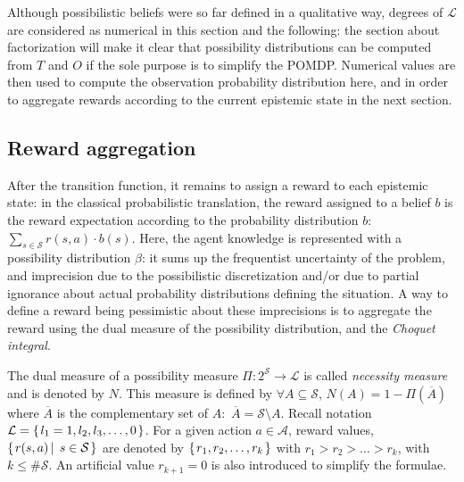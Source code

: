 Although possibilistic beliefs were so far defined in 
a qualitative way, degrees 
of $\mathcal{L}$ are considered as numerical in this section and
the following: the section about factorization will make it clear that
possibility distributions can be computed from $T$ and $O$ if the
sole purpose is to simplify the POMDP.
Numerical values are then used to compute the observation probability distribution
here, and in order to aggregate rewards according to the current epistemic state 
in the next section.

\subsection{Reward aggregation}
\label{aggreg}
After the transition function, it remains to assign a reward to each epistemic state:
in the classical probabilistic translation, the reward assigned to a belief $b$ is
the reward expectation according to the probability distribution $b$: $\sum_{s \in \mathcal{S}} r(s,a) \cdot b(s)$.
Here, the agent knowledge is represented with a possibility distribution $\beta$: 
it sums up the frequentist uncertainty of the problem, 
and imprecision due to the possibilistic discretization 
and/or due to partial ignorance about actual probability distributions
defining the situation.
A way to define a reward being pessimistic about these imprecisions is to aggregate the
reward using the dual measure of the possibility distribution, and the \textit{Choquet integral}.

The dual measure of a possibility measure $\Pi:2^{\mathcal{S}} \rightarrow \mathcal{L}$
is called \textit{necessity measure} and is denoted by $N$. This measure is defined
by $\forall A \subseteq \mathcal{S}$, $N(A) = 1 - \Pi(\overline{A})$ where $\overline{A}$
is the complementary set of $A:$ $\overline{A} = \mathcal{S} \setminus A $.
Recall notation $\mathcal{L} = \left\{ \left.  l_1=1,l_2,l_3, \ldots, 0  \right. \right\}$.
For a given action $a \in \mathcal{A}$, reward values, 
$\left\{ \left.  r(s,a) \, \right| \left. \, s \in \mathcal{S}  \right. \right\}$ are denoted by
$\left\{ \left. r_1,r_2,\ldots,r_k \right. \right\}$ with $r_1 > r_2 > \ldots > r_k$, 
with $k \leqslant \# \mathcal{S}$. An artificial value $r_{k+1}=0$ is also
introduced to simplify the formulae.

